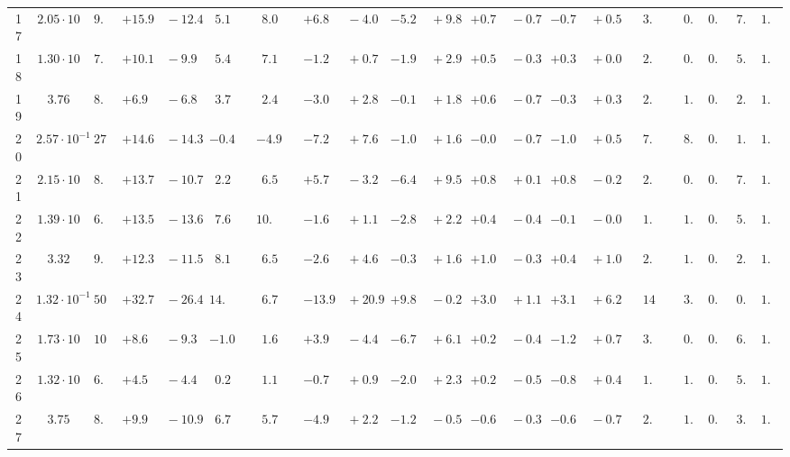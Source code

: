 \documentclass[12pt]{article}
\begin{document}
\begin{table}
\begin{tabular}{ccrr@{\hskip0pt}rrc@{\hskip0pt}r@{\hskip0pt}c@{\hskip0pt}r@{\hskip0pt}rr@{\hskip0pt}rr@{\hskip0pt}rr@{\hskip0pt}rr@{\hskip0pt}r@{\hskip0pt}r@{\hskip0pt}c|rr|r}
17 &$2.05 \cdot 10$ &$ 9.5$  & ${+15.9~}$&${~-12.4}$ & $ 5.1$  & &$ 8.0$&&${+6.8~}$&${~-4.0}$ & ${-5.2~}$&${~+9.8}$ & ${+0.7~}$&${~-0.7}$ & ${-0.7~}$&${~+0.5}$ & &$ 3.2$&&$ 0.8$  & $0.73$  & $ 7.5$  & $1.04$   \\ 
18 &$1.30 \cdot 10$ &$ 7.2$  & ${+10.1~}$&${~-9.9}$ & $ 5.4$  & &$ 7.1$&&${-1.2~}$&${~+0.7}$ & ${-1.9~}$&${~+2.9}$ & ${+0.5~}$&${~-0.3}$ & ${+0.3~}$&${~+0.0}$ & &$ 2.1$&&$ 0.6$  & $0.79$  & $ 5.4$  & $1.04$   \\ 
19 &$3.76$ &$ 8.6$  & ${+6.9~}$&${~-6.8}$ & $ 3.7$  & &$ 2.4$&&${-3.0~}$&${~+2.8}$ & ${-0.1~}$&${~+1.8}$ & ${+0.6~}$&${~-0.7}$ & ${-0.3~}$&${~+0.3}$ & &$ 2.3$&&$ 1.8$  & $0.84$  & $ 2.8$  & $1.04$   \\ 
20 &$2.57 \cdot 10^{-1}$ &$27.8$  & ${+14.6~}$&${~-14.3}$ & $-0.4$  & &$-4.9$&&${-7.2~}$&${~+7.6}$ & ${-1.0~}$&${~+1.6}$ & ${-0.0~}$&${~-0.7}$ & ${-1.0~}$&${~+0.5}$ & &$ 7.4$&&$ 8.2$  & $0.86$  & $ 1.7$  & $1.03$   \\ 
21 &$2.15 \cdot 10$ &$ 8.7$  & ${+13.7~}$&${~-10.7}$ & $ 2.2$  & &$ 6.5$&&${+5.7~}$&${~-3.2}$ & ${-6.4~}$&${~+9.5}$ & ${+0.8~}$&${~+0.1}$ & ${+0.8~}$&${~-0.2}$ & &$ 2.8$&&$ 0.6$  & $0.73$  & $ 7.2$  & $1.04$   \\ 
22 &$1.39 \cdot 10$ &$ 6.2$  & ${+13.5~}$&${~-13.6}$ & $ 7.6$  & &$10.3$&&${-1.6~}$&${~+1.1}$ & ${-2.8~}$&${~+2.2}$ & ${+0.4~}$&${~-0.4}$ & ${-0.1~}$&${~-0.0}$ & &$ 1.6$&&$ 1.0$  & $0.79$  & $ 5.2$  & $1.04$   \\ 
23 &$3.32$ &$ 9.1$  & ${+12.3~}$&${~-11.5}$ & $ 8.1$  & &$ 6.5$&&${-2.6~}$&${~+4.6}$ & ${-0.3~}$&${~+1.6}$ & ${+1.0~}$&${~-0.3}$ & ${+0.4~}$&${~+1.0}$ & &$ 2.3$&&$ 1.9$  & $0.83$  & $ 2.5$  & $1.05$   \\ 
24 &$1.32 \cdot 10^{-1}$ &$50.8$  & ${+32.7~}$&${~-26.4}$ & $14.4$  & &$ 6.7$&&${-13.9~}$&${~+20.9}$ & ${+9.8~}$&${~-0.2}$ & ${+3.0~}$&${~+1.1}$ & ${+3.1~}$&${~+6.2}$ & &$14.8$&&$ 3.6$  & $0.85$  & $ 0.8$  & $1.05$   \\ 
25 &$1.73 \cdot 10$ &$10.4$  & ${+8.6~}$&${~-9.3}$ & $-1.0$  & &$ 1.6$&&${+3.9~}$&${~-4.4}$ & ${-6.7~}$&${~+6.1}$ & ${+0.2~}$&${~-0.4}$ & ${-1.2~}$&${~+0.7}$ & &$ 3.1$&&$ 0.5$  & $0.73$  & $ 6.8$  & $1.04$   \\ 
26 &$1.32 \cdot 10$ &$ 6.7$  & ${+4.5~}$&${~-4.4}$ & $ 0.2$  & &$ 1.1$&&${-0.7~}$&${~+0.9}$ & ${-2.0~}$&${~+2.3}$ & ${+0.2~}$&${~-0.5}$ & ${-0.8~}$&${~+0.4}$ & &$ 1.7$&&$ 1.3$  & $0.78$  & $ 5.6$  & $1.04$   \\ 
27 &$3.75$ &$ 8.6$  & ${+9.9~}$&${~-10.9}$ & $ 6.7$  & &$ 5.7$&&${-4.9~}$&${~+2.2}$ & ${-1.2~}$&${~-0.5}$ & ${-0.6~}$&${~-0.3}$ & ${-0.6~}$&${~-0.7}$ & &$ 2.1$&&$ 1.2$  & $0.84$  & $ 3.6$  & $1.04$   \\ 

\end{tabular}
\end{table}
\end{document}
